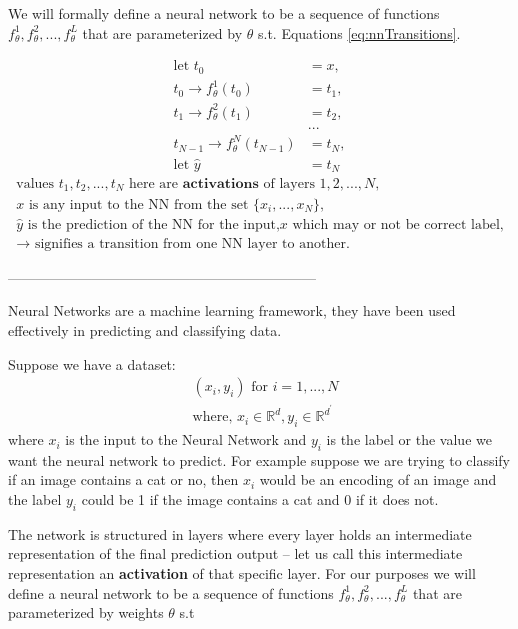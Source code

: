 \documentclass[dissertation.tex]{subfiles}
\begin{document}
We will formally define a neural network to be a sequence of functions
$f_{\theta}^1,f_{\theta}^2,...,f_{\theta}^L$ that are parameterized by
$\theta$ s.t. Equations \ref{eq:nnTransitions}.

\vbox{
\begin{align}
	\text{let } t_0 &= x, \nonumber \\
  t_0 \rightarrow f_{\theta}^1(t_0) &= t_1, \nonumber \\
  t_1 \rightarrow f_{\theta}^2(t_1) &= t_2, \nonumber \\
  &... \nonumber \\
  t_{N-1} \rightarrow f_{\theta}^N(t_{N-1}) &= t_N, \nonumber\\
  \text{let } \hat{y} &= t_N
\end{align}
\vspace*{-\baselineskip}
\vspace*{-\baselineskip}
\begin{gather}
  \text{values } t_1,t_2,...,t_N 
  \text{ here are } \textbf{activations } \text{of layers } 1,2,...,N,
	\nonumber\\
	x \text{ is any input to the NN from the set } \{x_i,...,x_N\}, \nonumber\\
	\hat{y} \text{ is the prediction of the NN for the input,} x
	\text{ which may or not be correct label,} \nonumber\\
	\rightarrow\text{ signifies a transition from one NN layer to another.}
	\nonumber
\end{gather}
}


------------------------------------------------------------------

Neural Networks are a machine learning framework, they have been used
effectively in predicting and classifying data.

Suppose we have a dataset:
\begin{align*}
  &(x_i, y_i) \text{ for } i = 1,...,N \\
  &\text{where, } x_i \in \mathbb{R}^d, y_i \in \mathbb{R}^{d^\prime}
\end{align*}
where $x_i$ is the input to the Neural Network and $y_i$ is the label or the
value we want the neural network to predict. For example suppose we are trying
to classify if an image contains a cat or no, then $x_i$ would be an encoding of
an image and the label $y_i$ could be 1 if the image contains a cat and 0 if it
does not.

The network is structured in layers where every layer holds an intermediate
representation of the final prediction output -- let us call this intermediate
representation an \textbf{activation} of that specific layer. For our purposes
we will define a neural network to be a sequence of functions
$f_{\theta}^1,f_{\theta}^2,...,f_{\theta}^L$ that are parameterized by weights
$\theta$ s.t
\end{document}
